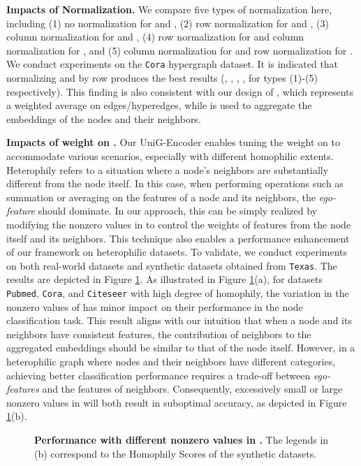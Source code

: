 \documentclass[review]{elsarticle}
\begin{document}
\textbf{Impacts of Normalization.} We compare five types of normalization here, including (1) no normalization for  and , (2) row normalization for  and , (3) column normalization for  and , (4) row normalization for  and column normalization for , and (5) column normalization for  and row normalization for . We conduct experiments on the \texttt{Cora} hypergraph dataset. It is indicated that normalizing  and  by row produces the best results (, , , ,  for types (1)-(5) respectively). This finding is also consistent with our design of , which represents a weighted average on edges/hyperedges, while  is used to aggregate the embeddings of the nodes and their neighbors.

\textbf{Impacts of weight on .} Our UniG-Encoder enables tuning the weight on  to accommodate various scenarios, especially with different homophilic extents. Heterophily refers to a situation where a node's neighbors are substantially different from the node itself. In this case, when performing operations such as summation or averaging on the features of a node and its neighbors, the \textit{ego-feature} should dominate. In our approach, this can be simply realized by modifying the nonzero values in  to control the weights of features from the node itself and its neighbors. This technique also enables a performance enhancement of our framework on heterophilic datasets. To validate, we conduct experiments on both real-world datasets and synthetic datasets obtained from \texttt{Texas}. The results are depicted in Figure \ref{fig:q1}. As illustrated in Figure \ref{fig:q1}(a), for datasets \texttt{Pubmed}, \texttt{Cora}, and \texttt{Citeseer} with high degree of homophily, the variation in the nonzero values of  has minor impact on their performance in the node classification task. This result aligns with our intuition that when a node and its neighbors have consistent features, the contribution of neighbors to the aggregated embeddings should be similar to that of the node itself. However, in a heterophilic graph where nodes and their neighbors have different categories, achieving better classification performance requires a trade-off between \textit{ego-features} and the features of neighbors. Consequently, excessively small or large nonzero values in  will both result in suboptimal accuracy, as depicted in Figure \ref{fig:q1}(b).

\begin{figure}[htbp]
  \centering
{}\hspace{8mm}
\caption{\textbf{Performance with different nonzero values in .} The legends in (b) correspond to the Homophily Scores of the synthetic datasets.}
  \label{fig:q1}
\end{figure}
\end{document}
